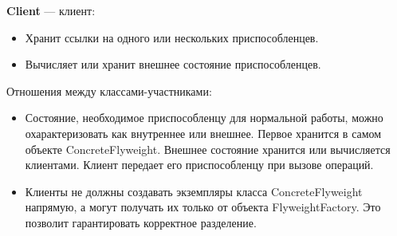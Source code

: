 \textbf{Client} --- клиент:
\begin{itemize}
\item Хранит ссылки на одного или нескольких приспособленцев.
\item Вычисляет или хранит внешнее состояние приспособленцев.
\end{itemize}

Отношения между классами-участниками:
\begin{itemize}
\item Состояние, необходимое приспособленцу для нормальной работы, можно
  охарактеризовать как внутреннее или внешнее.
  Первое хранится в самом объекте ConcreteFlyweight.
  Внешнее состояние хранится или вычисляется клиентами.
  Клиент передает его приспособленцу при вызове операций.
\item Клиенты не должны создавать экземпляры класса ConcreteFlyweight
  напрямую, а могут получать их только от объекта FlyweightFactory. Это
  позволит гарантировать корректное разделение.
\end{itemize}

